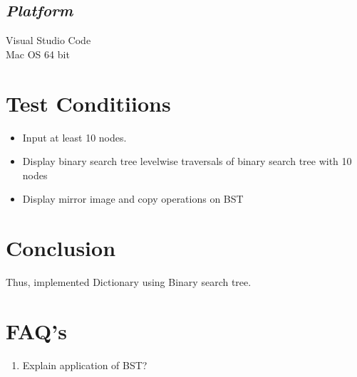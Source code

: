 \documentclass{article}
\begin{document}
\begin{enumerate}
\subsection{\textbf{\textit{Platform}}}
Visual Studio Code\\
Mac OS 64 bit
\section{\textbf{Test Conditiions}}
\begin{itemize}
	\item Input at least 10 nodes.
	\item Display binary search tree levelwise traversals of binary search tree with 10 nodes
	\item Display mirror image and copy operations on BST
\end{itemize}
\section{\textbf{Conclusion}}
Thus, implemented Dictionary using Binary search tree.
\section{\textbf{FAQ's}}
\begin{enumerate}
	\item Explain application of BST?\\
	

\end{enumerate}
\end{enumerate}
\end{document}
